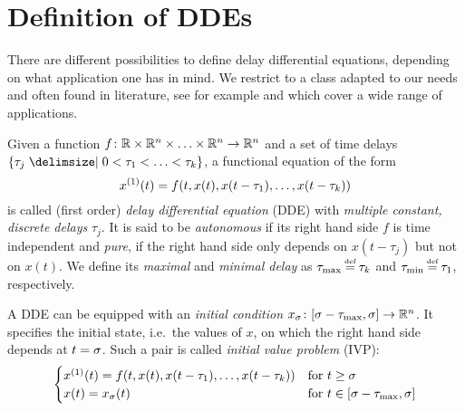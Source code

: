 \section{Definition of DDEs}
    \label{sec:definition-dde}

    There are different possibilities to define delay differential equations, depending on what application one has in mind.
    We restrict to a class adapted to our needs and often found in literature, see for example \cite{Roussel04DDEs} and which cover a wide range of applications.

    \begin{definition}\label{def:dde}
        Given a function $f\colon\mathbb{R}\times\mathbb{R}^n\times\ldots\times\mathbb{R}^n\to\mathbb{R}^n$ and a set of time delays $\set{\tau_j\with 0<\tau_1<\ldots<\tau_k}$, a functional equation of the form
        \begin{equation}\label{eq:dde}
            \D{x}(t) = f(t,x(t),x(t-\tau_1),\ldots,x(t-\tau_k))
        \end{equation}
        is called (first order) \emph{delay differential equation} (DDE) with \emph{multiple constant, discrete delays} $\tau_j$.
        It is said to be \emph{autonomous} if its right hand side $f$ is time independent and \emph{pure}, if the right hand side only depends on $x(t-\tau_j)$ but not on $x(t)$.
        We define its \emph{maximal} and \emph{minimal delay} as $\taumax\defeq\tau_k$ and $\taumin\defeq\tau_1$, respectively.

        A DDE can be equipped with an \emph{initial condition} $x_{\sigma}\colon [\sigma-\tau_{\max},\sigma] \to\mathbb{R}^n$. It specifies the initial state, i.e.\ the values of $x$, on which the right hand side depends at $t=\sigma$.
        Such a pair is called \emph{initial value problem} (IVP):
        \begin{equation}\label{eq:ivp}
            \begin{cases}
                \D{x}(t) = f(t,x(t),x(t-\tau_1),\ldots,x(t-\tau_k)) & \text{for } t\geq\tzero\\
                x(t) = x_{\tzero}(t) & \text{for } t\in\compactum{\tzero-\taumax}{\tzero}
            \end{cases}
        \end{equation}
    \end{definition}

